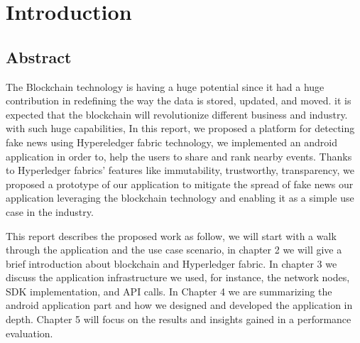 \chapter{Introduction}

	
	
	 
	 
	\section{Abstract}

The Blockchain technology is having a huge potential since it had a huge contribution in redefining the way the data is stored, updated, and moved.
it is expected that the blockchain will revolutionize different business and industry. with such huge capabilities,
In this report, we proposed a platform for detecting fake news using Hypereledger fabric technology, we implemented an android application in order to, help the users to share and rank nearby events. Thanks to Hyperledger fabrics' features like immutability, trustworthy, transparency, we proposed a prototype of our application to mitigate the spread of fake news our application leveraging the blockchain technology and enabling it as a simple use case in the industry.\newline 

This report describes the proposed work as follow, we will start with a walk through the application and the use case scenario, in chapter 2 we will give a brief introduction about blockchain and Hyperledger fabric. In chapter 3 we discuss the application infrastructure we used, for instance, the network nodes, SDK implementation, and API calls. In Chapter 4 we are summarizing the android application part and how we designed and developed the application in depth. Chapter 5 will focus on the results and insights gained in a performance evaluation.
\cleardoublepage

